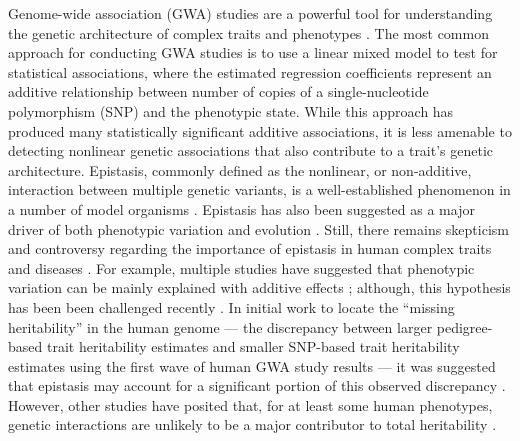 \documentclass[10pt]{article}
\begin{document}
Genome-wide association (GWA) studies are a powerful tool for understanding the genetic architecture of complex traits and phenotypes \cite{Buniello2019}. The most common approach for conducting GWA studies is to use a linear mixed model to test for statistical associations, where the estimated regression coefficients represent an additive relationship between number of copies of a single-nucleotide polymorphism (SNP) and the phenotypic state. While this approach has produced many statistically significant additive associations, it is less amenable to detecting nonlinear genetic associations that also contribute to a trait's genetic architecture. Epistasis, commonly defined as the nonlinear, or non-additive, interaction between multiple genetic variants, is a well-established phenomenon in a number of model organisms \cite{Lehner2006,Rowe2008,Shao2008,Flint2009,Costanzo2010,He2010,Jarvis2011,Pettersson2011,Bloom2013,Monnahan2015}. Epistasis has also been suggested as a major driver of both phenotypic variation and evolution \cite{Carlborg2004,Carlborg2006,Martin2007,Phillips2008,Moore2009,Zuk2012,Jones2014,Mackay2014}. Still, there remains skepticism and controversy regarding the importance of epistasis in human complex traits and diseases \cite{Hill2008,Crow2010,Yang2010,Aschard2012,Powell2013,Maki-Tanila2014,Wood2014a,Yang2015}. For example, multiple studies have suggested that phenotypic variation can be mainly explained with additive effects \cite{Hill2008,Crow2010,Maki-Tanila2014}; although, this hypothesis has been been challenged recently \cite{Huang2016}. In initial work to locate the  ``missing heritability'' in the human genome --- the discrepancy between larger pedigree-based trait heritability estimates and smaller SNP-based trait heritability estimates using the first wave of human GWA study results \cite{Maher2008,Manolio2009,Eichler2010} --- it was suggested that epistasis may account for a significant portion of this observed discrepancy \cite{Slatkin2009,Zuk2012,Hemani2013}. However, other studies have posited that, for at least some human phenotypes, genetic interactions are unlikely to be a major contributor to total heritability \cite{Yang2015,Wainschtein2019,Roberts2020}.
\end{document}

